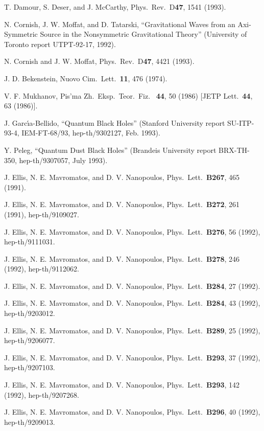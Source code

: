 \documentclass[12pt]{article}
\begin{document}
\begin{thebibliography}{999}
 T. Damour, S. Deser, and J. McCarthy,
Phys.\ Rev.\ D{\bf 47}, 1541 (1993).

 N. Cornish, J. W. Moffat, and D. Tatarski,
``Gravitational Waves from an Axi-Symmetric Source in
the Nonsymmetric Gravitational Theory'' (University of Toronto
report UTPT-92-17, 1992).

 N. Cornish and J. W. Moffat, Phys.\ Rev.\ D{\bf 47},
4421 (1993).

 J. D. Bekenstein, Nuovo Cim.\ Lett.\ {\bf 11},
476 (1974).

 V. F. Mukhanov, Pis'ma Zh.\ Eksp.\ Teor.\ Fiz.\ {\bf
44},
50 (1986) [JETP Lett.\ {\bf 44}, 63 (1986)].

 J. Garc\'{\i}a-Bellido, ``Quantum Black Holes''
(Stanford University report SU-ITP-93-4, IEM-FT-68/93,
hep-th/9302127,
Feb. 1993).

 Y. Peleg, ``Quantum Dust Black Holes''
(Brandeis University report BRX-TH-350, hep-th/9307057, July 1993).

 J. Ellis, N. E. Mavromatos, and D. V. Nanopoulos,
Phys.\ Lett.\ {\bf B267}, 465 (1991).

 J. Ellis, N. E. Mavromatos, and D. V. Nanopoulos,
Phys.\ Lett.\ {\bf B272}, 261 (1991), hep-th/9109027.

 J. Ellis, N. E. Mavromatos, and D. V. Nanopoulos,
Phys.\ Lett.\ {\bf B276}, 56 (1992), hep-th/9111031.

 J. Ellis, N. E. Mavromatos, and D. V. Nanopoulos,
Phys.\ Lett.\ {\bf B278}, 246 (1992), hep-th/9112062.

 J. Ellis, N. E. Mavromatos, and D. V. Nanopoulos,
Phys.\ Lett.\ {\bf B284}, 27 (1992).

 J. Ellis, N. E. Mavromatos, and D. V. Nanopoulos,
Phys.\ Lett.\ {\bf B284}, 43 (1992), hep-th/9203012.

 J. Ellis, N. E. Mavromatos, and D. V. Nanopoulos,
Phys.\ Lett.\ {\bf B289}, 25 (1992), hep-th/9206077.

 J. Ellis, N. E. Mavromatos, and D. V. Nanopoulos,
Phys.\ Lett.\ {\bf B293}, 37 (1992), hep-th/9207103.

 J. Ellis, N. E. Mavromatos, and D. V. Nanopoulos,
Phys.\ Lett.\ {\bf B293}, 142 (1992), hep-th/9207268.

 J. Ellis, N. E. Mavromatos, and D. V. Nanopoulos,
Phys.\ Lett.\ {\bf B296}, 40 (1992), hep-th/9209013.


\end{thebibliography}
\end{document}
